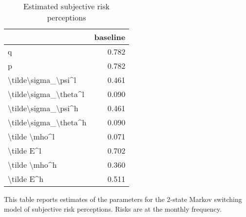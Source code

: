 
\begin{table}[p]
\centering
\begin{adjustbox}{width=0.3\textwidth}
\begin{threeparttable}
\caption{Estimated subjective risk perceptions}
\label{tab:PRMarkovEst}\begin{tabular}{lr}
\toprule
{} &  baseline \\
\midrule
q                     &     0.782 \\
p                     &     0.782 \\
\textbackslash tilde\textbackslash sigma\_\textbackslash psi\textasciicircum l   &     0.461 \\
\textbackslash tilde\textbackslash sigma\_\textbackslash theta\textasciicircum l &     0.090 \\
\textbackslash tilde\textbackslash sigma\_\textbackslash psi\textasciicircum h   &     0.461 \\
\textbackslash tilde\textbackslash sigma\_\textbackslash theta\textasciicircum h &     0.090 \\
\textbackslash tilde \textbackslash mho\textasciicircum l         &     0.071 \\
\textbackslash tilde E\textasciicircum l            &     0.702 \\
\textbackslash tilde \textbackslash mho\textasciicircum h         &     0.360 \\
\textbackslash tilde E\textasciicircum h            &     0.511 \\
\bottomrule
\end{tabular}
\begin{tablenotes}\item This table reports estimates of the parameters 
for the 2-state Markov switching model of subjective risk perceptions. Risks are at the monthly frequency. 
\end{tablenotes}
\end{threeparttable}
\end{adjustbox}
\end{table}